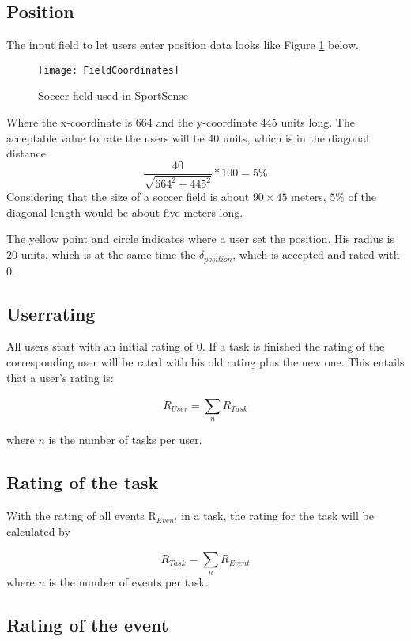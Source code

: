 \subsection{Position}

The input field to let users enter position data looks like Figure \ref{img:Field} below.

\begin{figure}
    \centering
    \texttt{[image: FieldCoordinates]}
    \caption{Soccer field used in SportSense}
    \label{img:Field}
\end{figure}

Where the x-coordinate is 664 and the y-coordinate 445 units long.
The acceptable value to rate the users will be 40 units, which is in the diagonal distance 
$$
	\frac{40}{\sqrt{664^2 + 445^2}}*100 = 5 \%
$$
Considering that the size of a soccer field is about $90\times45$ meters, $5\%$ of the diagonal length would be about five meters long.

The yellow point and circle indicates where a user set the position. His radius is 20 units, which is at the same time the $\delta_{position}$, which is accepted and rated with 0.


\subsection{Userrating}\label{subsec:userRating}
All users start with an initial rating of 0. If a task is finished the rating of the corresponding user will be rated with his old rating plus the new one.
This entails that a user's rating is:

\begin{equation}
	R_{User}=\sum\limits^{}_{n} R_{Task}
\end{equation}

where $n$ is the number of tasks per user.


\subsection{Rating of the task}

With the rating of all events R$_{Event}$ in a task, the rating for the task will be calculated by 

\begin{equation}
	R_{Task}=\sum\limits^{}_{n} R_{Event}
\end{equation}
where $n$ is the number of events per task.


\subsection{Rating of the event}

